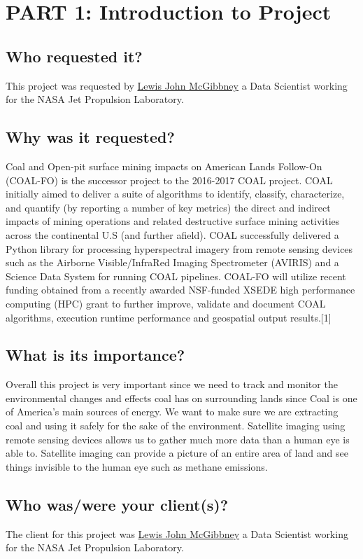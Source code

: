 \documentclass[onecolumn, draftclsnofoot,10pt, compsoc]{IEEEtran}
\begin{document}
\section{PART 1: Introduction to Project}
\subsection{Who requested it?}
This project was requested by \href{https://github.com/lewismc}{Lewis John McGibbney} a Data Scientist working for the NASA Jet Propulsion Laboratory. 
\subsection{Why was it requested?}
Coal and Open-pit surface mining impacts on American Lands Follow-On (COAL-FO) is the successor 				project to the 2016-2017 COAL project. COAL initially aimed to deliver a suite of algorithms to identify, classify, characterize, and quantify (by reporting a number of key metrics) the direct and indirect impacts of mining operations and related destructive surface mining activities across the continental U.S (and further afield). COAL successfully delivered a Python library for processing hyperspectral imagery from remote sensing devices such as the Airborne Visible/InfraRed Imaging Spectrometer (AVIRIS) and a Science Data System for running COAL pipelines. COAL-FO will utilize recent funding obtained from a recently awarded NSF-funded XSEDE high performance computing (HPC) grant to further improve, validate and document COAL algorithms, execution runtime performance and geospatial output results.[1]
\subsection{What is its importance?}
Overall this project is very important since we need to track and monitor the
environmental changes and effects coal has on surrounding lands since Coal is
one of America's main sources of energy. We want to make sure we are extracting
coal and using it safely for the sake of the environment. Satellite imaging
using remote sensing devices allows us to gather much more data than a human
eye is able to. Satellite imaging can provide a picture of an entire area of
land and see things invisible to the human eye such as methane emissions.
\subsection{Who was/were your client(s)?}
The client for this project was \href{https://github.com/lewismc}{Lewis John McGibbney} a Data Scientist working for the NASA Jet Propulsion Laboratory. 
\end{document}
